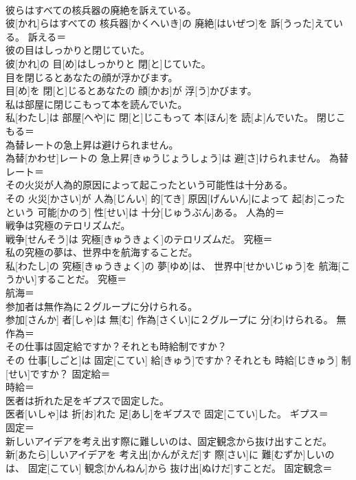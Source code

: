 \documentclass[8pt]{extreport}
\begin{document}
\begin{CJK}{UTF8}{min}
\\	彼らはすべての核兵器の廃絶を訴えている。	
\\	彼[かれ]らはすべての 核兵器[かくへいき]の 廃絶[はいぜつ]を 訴[うった]えている。	訴える＝ 
\\	彼の目はしっかりと閉じていた。	
\\	彼[かれ]の 目[め]はしっかりと 閉[と]じていた。	
\\	目を閉じるとあなたの顔が浮かびます。	
\\	目[め]を 閉[と]じるとあなたの 顔[かお]が 浮[う]かびます。	
\\	私は部屋に閉じこもって本を読んでいた。	
\\	私[わたし]は 部屋[へや]に 閉[と]じこもって 本[ほん]を 読[よ]んでいた。	閉じこもる＝ 
\\	為替レートの急上昇は避けられません。	
\\	為替[かわせ]レートの 急上昇[きゅうじょうしょう]は 避[さ]けられません。	為替レート＝ 
\\	その火災が人為的原因によって起こったという可能性は十分ある。	
\\	その 火災[かさい]が 人為[じんい] 的[てき] 原因[げんいん]によって 起[お]こったという 可能[かのう] 性[せい]は 十分[じゅうぶん]ある。	人為的＝ 
\\	戦争は究極のテロリズムだ。	
\\	戦争[せんそう]は 究極[きゅうきょく]のテロリズムだ。	究極＝ 
\\	私の究極の夢は、世界中を航海することだ。	
\\	私[わたし]の 究極[きゅうきょく]の 夢[ゆめ]は、 世界中[せかいじゅう]を 航海[こうかい]することだ。	究極＝ 
\\	航海＝ 
\\	参加者は無作為に２グループに分けられる。	
\\	参加[さんか] 者[しゃ]は 無[む] 作為[さくい]に２グループに 分[わ]けられる。	無作為＝ 
\\	その仕事は固定給ですか？それとも時給制ですか？	
\\	その 仕事[しごと]は 固定[こてい] 給[きゅう]ですか？それとも 時給[じきゅう] 制[せい]ですか？	固定給＝ 
\\	時給＝ 
\\	医者は折れた足をギプスで固定した。	
\\	医者[いしゃ]は 折[お]れた 足[あし]をギプスで 固定[こてい]した。	ギプス＝ 
\\	固定＝ 
\\	新しいアイデアを考え出す際に難しいのは、固定観念から抜け出すことだ。	
\\	新[あたら]しいアイデアを 考え出[かんがえだ]す 際[さい]に 難[むずか]しいのは、 固定[こてい] 観念[かんねん]から 抜け出[ぬけだ]すことだ。	固定観念＝ 

\end{CJK}
\end{document}
